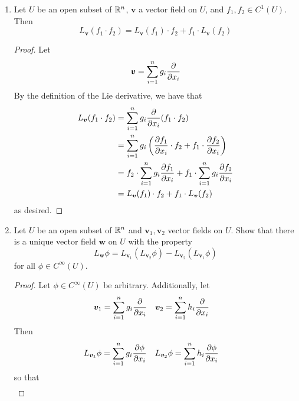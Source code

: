 \documentclass[../psets.tex]{subfiles}
\begin{document}
\begin{enumerate}[label={\textbf{2.1.\roman*.}}]
\begin{proof}
\begin{align*}
        \end{align*}
        as desired.
    \end{proof}
    \item Let $U$ be an open subset of $\mathbb{R}^n$, $\bm{v}$ a vector field on $U$, and $f_1,f_2\in C^1(U)$. Then
    \begin{equation*}
        L_{\bm{v}}(f_1\cdot f_2) = L_{\bm{v}}(f_1)\cdot f_2+f_1\cdot L_{\bm{v}}(f_2)
    \end{equation*}
    \begin{proof}
        Let
        \begin{equation*}
            \bm{v} = \sum_{i=1}^ng_i\pdv{x_i}
        \end{equation*}
        By the definition of the Lie derivative, we have that
        \begingroup
        \allowdisplaybreaks
        \begin{align*}
            L_{\bm{v}}(f_1\cdot f_2) &= \sum_{i=1}^ng_i\pdv{x_i}(f_1\cdot f_2)\\
            &= \sum_{i=1}^ng_i\left( \pdv{f_1}{x_i}\cdot f_2+f_1\cdot\pdv{f_2}{x_i} \right)\\
            &= f_2\cdot\sum_{i=1}^ng_i\pdv{f_1}{x_i}+f_1\cdot\sum_{i=1}^ng_i\pdv{f_2}{x_i}\\
            &= L_{\bm{v}}(f_1)\cdot f_2+f_1\cdot L_{\bm{v}}(f_2)
        \end{align*}
        \endgroup
        as desired.
    \end{proof}
    \item Let $U$ be an open subset of $\mathbb{R}^n$ and $\bm{v}_1,\bm{v}_2$ vector fields on $U$. Show that there is a unique vector field $\bm{w}$ on $U$ with the property
    \begin{equation*}
        L_{\bm{w}}\phi = L_{\bm{v}_1}(L_{\bm{v}_2}\phi)-L_{\bm{v}_2}(L_{\bm{v}_1}\phi)
    \end{equation*}
    for all $\phi\in C^\infty(U)$.
    \begin{proof}
        Let $\phi\in C^\infty(U)$ be arbitrary. Additionally, let
        \begin{align*}
            \bm{v}_1 &= \sum_{i=1}^ng_i\pdv{x_i}&
            \bm{v}_2 &= \sum_{i=1}^nh_i\pdv{x_i}
        \end{align*}
        Then
        \begin{align*}
            L_{\bm{v}_1}\phi &= \sum_{i=1}^ng_i\pdv{\phi}{x_i}&
            L_{\bm{v}_2}\phi &= \sum_{i=1}^nh_i\pdv{\phi}{x_i}
        \end{align*}
        so that
        \begin{align*}

\end{align*}
\end{proof}
\end{enumerate}
\end{document}
